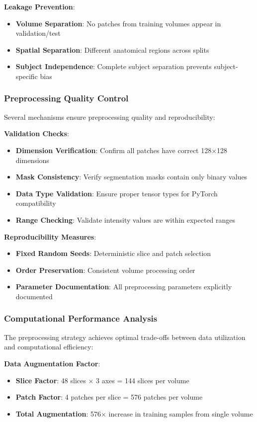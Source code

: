 \documentclass[12pt,a4paper]{article}
\begin{document}
\textbf{Leakage Prevention}:
\begin{itemize}
    \item \textbf{Volume Separation}: No patches from training volumes appear in validation/test
    \item \textbf{Spatial Separation}: Different anatomical regions across splits
    \item \textbf{Subject Independence}: Complete subject separation prevents subject-specific bias
\end{itemize}

\subsubsection{Preprocessing Quality Control}

Several mechanisms ensure preprocessing quality and reproducibility:

\textbf{Validation Checks}:
\begin{itemize}
    \item \textbf{Dimension Verification}: Confirm all patches have correct 128×128 dimensions
    \item \textbf{Mask Consistency}: Verify segmentation masks contain only binary values
    \item \textbf{Data Type Validation}: Ensure proper tensor types for PyTorch compatibility
    \item \textbf{Range Checking}: Validate intensity values are within expected ranges
\end{itemize}

\textbf{Reproducibility Measures}:
\begin{itemize}
    \item \textbf{Fixed Random Seeds}: Deterministic slice and patch selection
    \item \textbf{Order Preservation}: Consistent volume processing order
    \item \textbf{Parameter Documentation}: All preprocessing parameters explicitly documented
\end{itemize}

\subsubsection{Computational Performance Analysis}

The preprocessing strategy achieves optimal trade-offs between data utilization and computational efficiency:

\textbf{Data Augmentation Factor}:
\begin{itemize}
    \item \textbf{Slice Factor}: 48 slices × 3 axes = 144 slices per volume
    \item \textbf{Patch Factor}: 4 patches per slice = 576 patches per volume
    \item \textbf{Total Augmentation}: 576× increase in training samples from single volume
\end{itemize}
\end{document}
